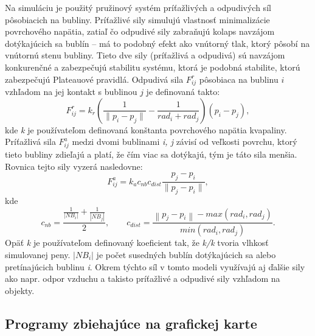 Na simuláciu je použitý pružinový systém príťažlivých a odpudivých síl pôsobiacich na bubliny. Príťažlivé sily simulujú vlastnosť minimalizácie povrchového napätia, zatiaľ čo odpudivé sily zabraňujú kolaps navzájom dotýkajúcich sa bublín – má to podobný efekt ako vnútorný tlak, ktorý pôsobí na vnútornú stenu bubliny. Tieto dve sily (príťažlivá a odpudivá) sú navzájom konkurenčné a zabezpečujú stabilitu systému, ktorá je podobná stabilite, ktorú zabezpečujú Plateauové pravidlá. Odpudivá sila $F_{ij}^{r}$ pôsobiaca na bublinu $i$ vzhľadom na jej kontakt s bublinou $j$ je definovaná takto:
\begin{equation}
	F_{ij}^{r}=k_{r}\left(\frac{1}{\parallel p_{i} - p_{j} \parallel} - \frac{1}{rad_{i} + rad_{j}}\right) \left(p_i - p_j\right), 
\end{equation}
kde \textit{k} je používateľom definovaná konštanta povrchového napätia kvapaliny. Príťažlivá sila \textit{$F_{ij}^{a}$} medzi dvomi bublinami \textit{i, j} závisí od veľkosti povrchu, ktorý tieto bubliny zdieľajú a platí, že čím viac sa dotýkajú, tým je táto sila menšia. Rovnica tejto sily vyzerá nasledovne:
\begin{equation}
	F_{ij}^{a} = k_{a}c_{nb}c_{dist}\frac{p_{j} - p_{i}}{\parallel p_{j} - p_{i}\parallel},
\end{equation}
kde
\begin{equation}
	c_{nb} = \frac{\frac{1}{\left | NB_{i} \right |} + \frac{1}{\left | NB_{j} \right |}}{2},\qquad c_{dist} = \frac{\left \| p_{j} - p_{i} \right \| - max(rad_{i}, rad_{j})}{min(rad_{i}, rad_{j})}.
\end{equation}
Opäť \textit{k} je používateľom definovaný koeficient tak, že \textit{k/k} tvoria vlhkosť simulovanej peny. $\left | NB_{i} \right |$ je počet susedných bublín dotýkajúcich sa alebo pretínajúcich bublinu \textit{i}. Okrem týchto síl v tomto modeli využívajú aj ďalšie sily ako napr. odpor vzduchu a takisto príťažlivé a odpudivé sily vzhľadom na objekty.

\subsection{Programy zbiehajúce na grafickej karte}

